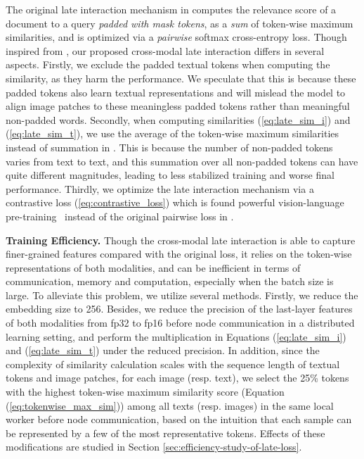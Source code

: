 The original late interaction mechanism in \citep{khattab2020colbert} computes the  relevance score of a document to a query \textit{padded with mask tokens}, as a \textit{sum} of token-wise maximum similarities,
and is optimized via a \textit{pairwise} softmax cross-entropy loss.
Though inspired from \citet{khattab2020colbert},  our proposed cross-modal late interaction differs in several aspects.
Firstly, we exclude the padded textual tokens when computing the similarity, as they harm the performance. 
We speculate that this is because these padded tokens also learn textual representations and will mislead the model to align image patches to these meaningless padded tokens rather than meaningful non-padded words.
Secondly, when computing similarities (\ref{eq:late_sim_i}) and (\ref{eq:late_sim_t}), we use the average of the token-wise maximum similarities instead of summation in \citep{khattab2020colbert}. This is because the number of non-padded tokens varies from text to text, and this summation over all non-padded tokens can have quite different magnitudes, leading to less stabilized training and worse final performance.
Thirdly, we optimize the late interaction mechanism via a contrastive loss (\ref{eq:contrastive_loss}) which is found powerful  vision-language pre-training~\citep{radford2021learning} instead of the original pairwise loss in \citep{khattab2020colbert}.

\textbf{Training Efficiency.}
Though the cross-modal late interaction is able to capture finer-grained features 
compared with the original loss, 
it relies on the token-wise representations of both modalities, 
and can be inefficient in terms of communication, memory and computation, especially when the batch size is large. 
To alleviate this problem, we utilize several methods.
Firstly, we reduce the embedding size
to 256.
Besides, we reduce the precision of the last-layer features of both modalities from fp32 to fp16 before node communication in a distributed learning setting, 
and perform the multiplication in Equations (\ref{eq:late_sim_i}) and (\ref{eq:late_sim_t}) under the reduced precision.
In addition, since the complexity of similarity calculation scales with the sequence length of 
textual tokens and image patches,
for each image (resp. text), we select the  25\% tokens with the highest token-wise maximum similarity score (Equation (\ref{eq:tokenwise_max_sim})) among all texts (resp. images) in the same local worker before node communication, based on the intuition that each sample can be represented by a few of the most representative tokens.  Effects of these modifications are studied in Section \ref{sec:efficiency-study-of-late-loss}.
    
